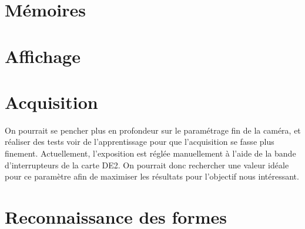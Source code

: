 \documentclass[10pt,a4paper]{report}
\begin{document}
\section{Mémoires}

\section{Affichage}



\section{Acquisition}

On pourrait se pencher plus en profondeur sur le paramétrage fin de la caméra, et réaliser des tests voir de l'apprentissage pour que l'acquisition se fasse plus finement. Actuellement, l'exposition est réglée manuellement à l'aide de la bande d'interrupteurs de la carte DE2. On pourrait donc rechercher une valeur idéale pour ce paramètre afin de maximiser les résultats pour l'objectif nous intéressant.

\section{Reconnaissance des formes}
\end{document}
